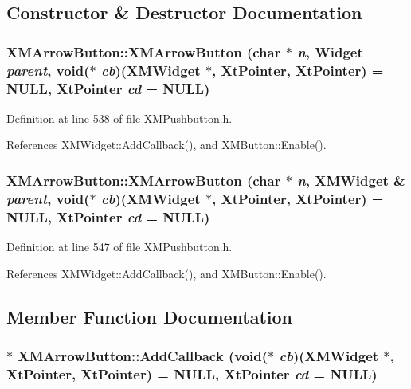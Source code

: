 \subsection{Constructor \& Destructor Documentation}
\subsubsection{\setlength{\rightskip}{0pt plus 5cm}XMArrow\-Button::XMArrow\-Button (char $\ast$ {\em n}, Widget {\em parent}, void($\ast$ {\em cb})({\bf XMWidget} $\ast$, Xt\-Pointer, Xt\-Pointer) = NULL, Xt\-Pointer {\em cd} = NULL)\hspace{0.3cm}{\tt  [inline]}}\label{classXMArrowButton_a0}




Definition at line 538 of file XMPushbutton.h.

References XMWidget::Add\-Callback(), and XMButton::Enable().
\subsubsection{\setlength{\rightskip}{0pt plus 5cm}XMArrow\-Button::XMArrow\-Button (char $\ast$ {\em n}, {\bf XMWidget} \& {\em parent}, void($\ast$ {\em cb})({\bf XMWidget} $\ast$, Xt\-Pointer, Xt\-Pointer) = NULL, Xt\-Pointer {\em cd} = NULL)\hspace{0.3cm}{\tt  [inline]}}\label{classXMArrowButton_a1}




Definition at line 547 of file XMPushbutton.h.

References XMWidget::Add\-Callback(), and XMButton::Enable().

\subsection{Member Function Documentation}
\subsubsection{$\ast$ XMArrow\-Button::Add\-Callback (void($\ast$ {\em cb})({\bf XMWidget} $\ast$, Xt\-Pointer, Xt\-Pointer) = NULL, Xt\-Pointer {\em cd} = NULL)\hspace{0.3cm}{\tt  [inline]}}\label{classXMArrowButton_a2}




